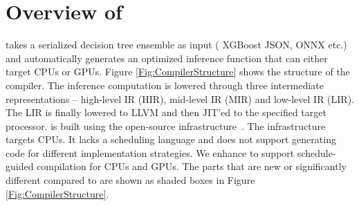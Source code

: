 \section{Overview of \Treebeard{}}


\Treebeard{} takes a serialized decision tree ensemble as input (
XGBoost JSON, ONNX etc.) and automatically generates an optimized inference function
that can either target CPUs or GPUs. 
Figure \ref{Fig:CompilerStructure} shows the structure of the \Treebeard{} compiler. 
The inference computation is lowered through three intermediate representations
-- high-level IR (HIR), mid-level IR (MIR) and low-level IR (LIR). The LIR is
finally lowered to LLVM and then JIT'ed to the specified target processor. 
\Treebeard{} is built using the open-source \TreebeardOLD{} infrastructure~\cite{Treebeard}.
The \TreebeardOLD{} infrastructure targets CPUs.
It lacks a scheduling language and does not support generating code for 
different implementation strategies. We enhance \TreebeardOLD{}  
to support schedule-guided compilation for CPUs and GPUs.
The parts \Treebeard{} that are new or significantly different compared to \TreebeardOLD{}
are shown as shaded boxes in Figure \ref{Fig:CompilerStructure}.

